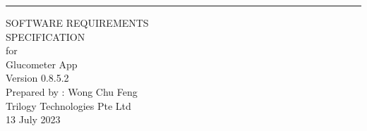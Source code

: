 \documentclass[a4paper]{scrreprt}
\date{}
\def\myversion{0.8.5.2 }
\begin{document}
\thispagestyle{currentpagefooter}

\begin{flushright}
    \rule{16cm}{5pt}\vskip2cm
    \begin{bfseries}
        \Huge{SOFTWARE REQUIREMENTS\\ SPECIFICATION}\\
        \vspace{3.5cm}
        for\\
        \vspace{1.5cm}
        Glucometer App\\
        \vspace{3.2cm}
        \LARGE{Version \myversion}\\
        \vspace{1.5cm}
        Prepared by : Wong Chu Feng\\
        \vspace{1.5cm}
        Trilogy Technologies Pte Ltd\\
        \vspace{1.5cm}
        13 July 2023\\
    \end{bfseries}
\end{flushright}
\clearpage
\end{document}
